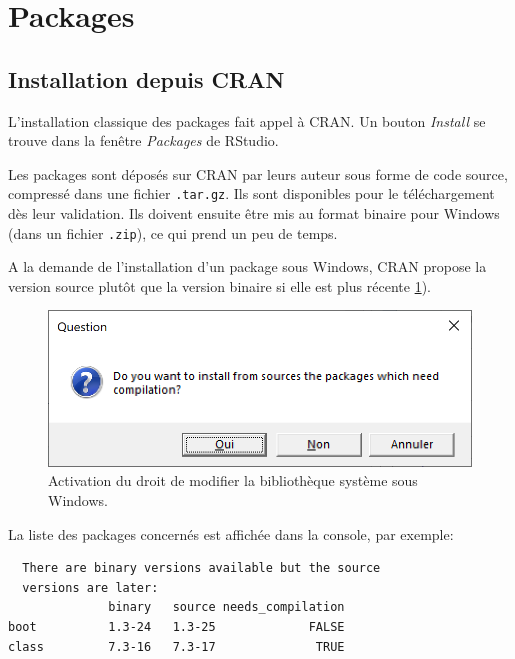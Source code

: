 \documentclass[
  12pt,
  french,
  a4paper,
  extrafontsizes,onecolumn,openright
  ]{memoir}
\begin{document}
\normalsize

\hypertarget{packages}{%
\section{Packages}\label{packages}}

\hypertarget{installation-depuis-cran}{%
\subsection{Installation depuis CRAN}\label{installation-depuis-cran}}

L'installation classique des packages fait appel à CRAN.
Un bouton \emph{Install} se trouve dans la fenêtre \emph{Packages} de RStudio.

Les packages sont déposés sur CRAN par leurs auteur sous forme de code source, compressé dans une fichier \texttt{.tar.gz}.
Ils sont disponibles pour le téléchargement dès leur validation.
Ils doivent ensuite être mis au format binaire pour Windows (dans un fichier \texttt{.zip}), ce qui prend un peu de temps.

A la demande de l'installation d'un package sous Windows, CRAN propose la version source plutôt que la version binaire si elle est plus récente \ref{fig:R-BinaryPkg}).



\scriptsize

\begin{figure}

{\centering \includegraphics[width=0.8\linewidth]{images/R-BinaryPkg} 

}

\caption{Activation du droit de modifier la bibliothèque système sous Windows.}\label{fig:R-BinaryPkg}
\end{figure}

\normalsize

La liste des packages concernés est affichée dans la console, par exemple:

\begin{verbatim}
  There are binary versions available but the source 
  versions are later:
              binary   source needs_compilation
boot          1.3-24   1.3-25             FALSE
class         7.3-16   7.3-17              TRUE
\end{verbatim}
\end{document}
